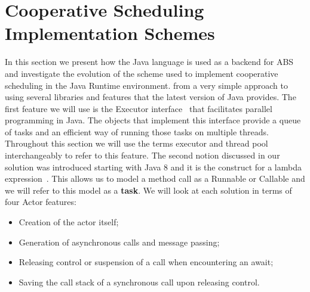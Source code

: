 \section{Cooperative Scheduling Implementation Schemes}
\label{scheme}

In this section we present how the Java language is used as a backend for ABS and investigate the evolution of the scheme used to implement cooperative scheduling in the Java Runtime environment.  from a very simple approach to using several libraries and features that the latest version of Java provides. The first feature we will use is the Executor interface~\cite{execserv} that facilitates parallel programming in Java. The objects that implement this interface provide a queue of tasks and an efficient way of running those tasks on multiple threads. Throughout this section we will use the terms executor and thread pool interchangeably to refer to this feature. The second notion discussed in our solution was introduced starting with Java 8 and it is the construct for a lambda expression~\cite{lambdas}. This allows us to model a method call as a Runnable or Callable and we will refer to this model as a \textbf{task}. We will look at each solution in terms of four Actor features:

\begin{itemize}
	\item Creation of the actor itself;
	\item Generation of asynchronous calls and message passing;
	\item Releasing control or suspension of a call when encountering an await;
	\item Saving the call stack of a synchronous call upon releasing control.
\end{itemize}




